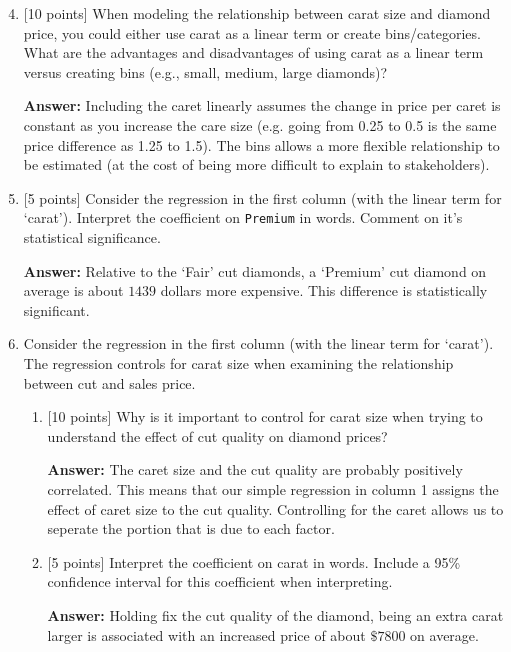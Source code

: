 \documentclass[12pt]{article}
\newcommand{\answer}[1]{{\color{blue_winged_teal}\textbf{Answer:} #1}}
\newcommand{\pts}[1]{{\color{zinc500}[#1 points]}}
\begin{document}
\begin{enumerate}
  \setcounter{enumi}{3}
  \item \pts{10} When modeling the relationship between carat size and diamond price, you could either use carat as a linear term or create bins/categories. 
  What are the advantages and disadvantages of using carat as a linear term versus creating bins (e.g., small, medium, large diamonds)?
  
  \answer{
    Including the caret linearly assumes the change in price per caret is constant as you increase the care size (e.g. going from 0.25 to 0.5 is the same price difference as 1.25 to 1.5).
    The bins allows a more flexible relationship to be estimated (at the cost of being more difficult to explain to stakeholders).
  }

  \bigskip
  \item \pts{5} Consider the regression in the first column (with the linear term for `carat'). 
  Interpret the coefficient on \texttt{Premium} in words. Comment on it's statistical significance.

  \answer{
    Relative to the `Fair' cut diamonds, a `Premium' cut diamond on average is about $1439$ dollars more expensive.
    This difference is statistically significant.
  }
  
  \bigskip
  \item  Consider the regression in the first column (with the linear term for `carat'). The regression controls for carat size when examining the relationship between cut and sales price.
  \begin{enumerate}[label=(\alph*)]
    \item \pts{10} Why is it important to control for carat size when trying to understand the effect of cut quality on diamond prices?

    \answer{
      The caret size and the cut quality are probably positively correlated. 
      This means that our simple regression in column 1 assigns the effect of caret size to the cut quality. 
      Controlling for the caret allows us to seperate the portion that is due to each factor.
    }
    
    \item \pts{5} Interpret the coefficient on carat in words. Include a 95\% confidence interval for this coefficient when interpreting.
    
    \answer{
      Holding fix the cut quality of the diamond, being an extra carat larger is associated with an increased price of about $\$7800$ on average. 
    }
  \end{enumerate}
\end{enumerate}
\end{document}
